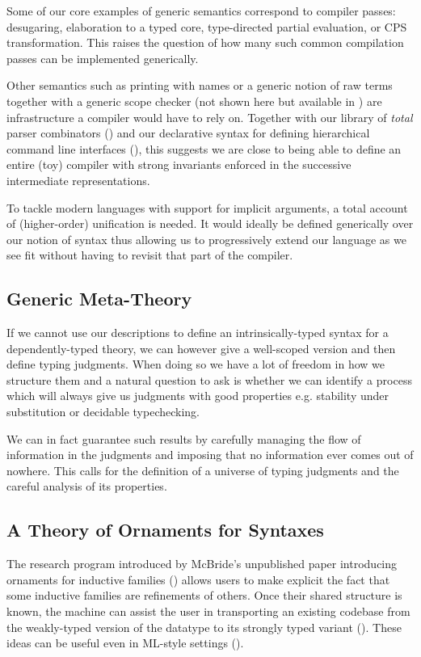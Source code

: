 Some of our core examples of generic semantics correspond to compiler passes:
desugaring, elaboration to a typed core, type-directed partial evaluation,
or CPS transformation. This raises the question of how many such common
compilation passes can be implemented generically.

Other semantics such as printing with names or a generic notion of raw terms
together with a generic scope checker (not shown here but available in \cite{repo2018})
are infrastructure a compiler would have to rely on. Together with our library of
\emph{total} parser combinators (\cite{allais2018agdarsec}) and our declarative
syntax for defining hierarchical command line interfaces (\cite{allaisagdargs}),
this suggests we are close to being able to define an entire (toy) compiler with
strong invariants enforced in the successive intermediate representations.

To tackle modern languages with support for implicit arguments, a total account of
(higher-order) unification is needed. It would ideally be defined generically over
our notion of syntax thus allowing us to progressively extend our language as we
see fit without having to revisit that part of the compiler.

\subsection{Generic Meta-Theory}

If we cannot use our descriptions to define an intrinsically-typed syntax for
a dependently-typed theory, we can however give a well-scoped version and then
define typing judgments. When doing so we have a lot of freedom in how we
structure them and a natural question to ask is whether we can identify a process
which will always give us judgments with good properties e.g. stability under
substitution or decidable typechecking.

We can in fact guarantee such results by carefully managing the flow of information
in the judgments and imposing that no information ever comes out of nowhere. This
calls for the definition of a universe of typing judgments and the careful analysis
of its properties.

\subsection{A Theory of Ornaments for Syntaxes}

The research program introduced by McBride's unpublished paper introducing
ornaments for inductive families (\citeyear{mcbride2010ornamental}) allows users
to make explicit the fact that some inductive families are refinements of others.
Once their shared structure is known, the machine can assist the user in
transporting an existing codebase from the weakly-typed version of the datatype
to its strongly typed variant (\cite{dagand_mcbride_2014}). These ideas can be
useful even in ML-style settings (\cite{Williams:2014:OP:2633628.2633631}).

